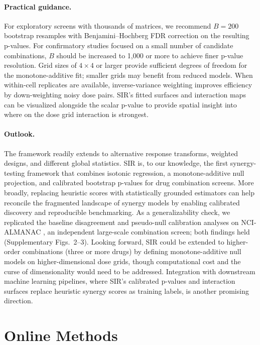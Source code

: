 \documentclass[pdflatex,sn-nature]{sn-jnl}%
\begin{document}
\paragraph{Practical guidance.}
For exploratory screens with thousands of matrices, we recommend $B=200$ bootstrap resamples with Benjamini--Hochberg FDR correction on the resulting p-values.
For confirmatory studies focused on a small number of candidate combinations, $B$ should be increased to 1{,}000 or more to achieve finer p-value resolution.
Grid sizes of $4\times 4$ or larger provide sufficient degrees of freedom for the monotone-additive fit; smaller grids may benefit from reduced models.
When within-cell replicates are available, inverse-variance weighting improves efficiency by down-weighting noisy dose pairs.
SIR's fitted surfaces and interaction maps can be visualized alongside the scalar p-value to provide spatial insight into where on the dose grid interaction is strongest.

\paragraph{Outlook.}
The framework readily extends to alternative response transforms, weighted designs, and different global statistics.
SIR is, to our knowledge, the first synergy-testing framework that combines isotonic regression, a monotone-additive null projection, and calibrated bootstrap p-values for drug combination screens.
More broadly, replacing heuristic scores with statistically grounded estimators can help reconcile the fragmented landscape of synergy models \cite{Greco1995,Meyer2020,PalmerSorger2017} by enabling calibrated discovery and reproducible benchmarking.
As a generalizability check, we replicated the baseline disagreement and pseudo-null calibration analyses on NCI-ALMANAC \cite{Holbeck2017}, an independent large-scale combination screen; both findings held (Supplementary Figs.~2--3).
Looking forward, SIR could be extended to higher-order combinations (three or more drugs) by defining monotone-additive null models on higher-dimensional dose grids, though computational cost and the curse of dimensionality would need to be addressed.
Integration with downstream machine learning pipelines, where SIR's calibrated p-values and interaction surfaces replace heuristic synergy scores as training labels, is another promising direction.

\section{Online Methods}
\end{document}
